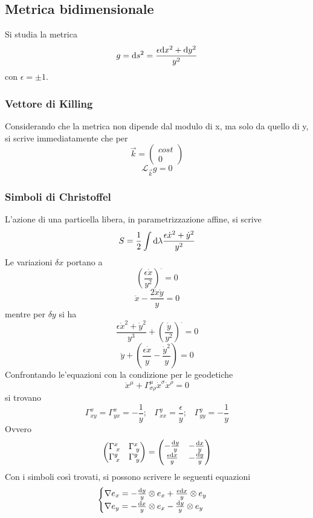 \subsection{Metrica bidimensionale}
Si studia la metrica
\[ g = \mathrm{d} s^2 = \frac{\epsilon \mathrm{d} x^2 + \mathrm{d} y^2}{y^2} \]
con \( \epsilon = \pm 1\).

\subsubsection*{Vettore di Killing} 
Considerando che la metrica non dipende dal modulo di x, ma solo da quello di y, si scrive immediatamente che per 
\[ \vec{k} = \left( \begin{array}{c}  cost \\ 0 \end{array}  \right) \]
\[ \mathcal{L}_{\vec{k}} g = 0 \]

\subsubsection*{Simboli di Christoffel}
L'azione di una particella libera, in parametrizzazione affine, si scrive
\[ S = \frac{1}{2} \int \mathrm{d} \lambda \frac{\epsilon \dot{x}^2 + \dot{y}^2}{y^2} \]
Le variazioni $\delta x$ portano a 
\[ \left(\frac{\epsilon \dot{x}}{y^2}\right)^\cdot = 0 \]
\[ \ddot{x} - \frac{2\dot{x}\dot{y}}{y} = 0 \]
mentre per $\delta y$ si ha
\[ \frac{\epsilon \dot{x}^2 + \dot{y}^2}{y^3} + \left(\frac{\dot{y}}{y^2}\right)^\cdot =0 \]
\[ \ddot{y} + \left(\frac{\epsilon \dot{x}}{y} - \frac{\dot{y}^2}{y} \right) =0 \]
Confrontando le'equazioni con la condizione per le geodetiche
\[ \ddot{x}^\mu + \Gamma^\mu_{\sigma\rho} \dot{x}^\sigma\dot{x}^\rho =0 \]
si trovano
\[ \Gamma^x_{xy} = \Gamma^x_{yx} = -\frac{1}{y} ; \;\;\; \Gamma^y_{xx} = \frac{\epsilon}{y} ; \;\;\; \Gamma^y_{yy} = - \frac{1}{y} \]
Ovvero
\begin{equation}
	\begin{pmatrix}
		\Gamma^x_{\; x} & \Gamma^x_{\; y} \\
		\Gamma^y_{\; x} & \Gamma^y_{\; y} 
	\end{pmatrix} = 
	\begin{pmatrix}
		-\frac{\mathrm{d} y}{y} 	& -\frac{\mathrm{d} x}{y}  \\
		\frac{\epsilon\mathrm{d} x}{y} & -\frac{\mathrm{d} y}{y} 
	\end{pmatrix}
\end{equation}
Con i simboli cos\`i trovati, si possono scrivere le seguenti equazioni
\begin{equation} 
	\begin{cases}
		\nabla e_x = -\frac{\mathrm{d} y}{y} \otimes e_x + \frac{e \mathrm{d} x}{y} \otimes e_y & \\ 
		\nabla e_y = -\frac{\mathrm{d} x}{y} \otimes e_x - \frac{\mathrm{d} y}{y} \otimes e_y & \\
	\end{cases}
\end{equation}

